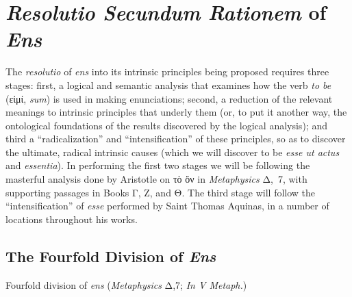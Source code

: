 \section{\emph{Resolutio Secundum Rationem} of \emph{Ens}}

The \emph{resolutio} of \emph{ens} into its intrinsic principles being proposed requires three stages: first, a logical and semantic analysis that examines how the verb \emph{to be} (εἰμί, \emph{sum}) is used in making enunciations; second, a reduction of the relevant meanings to intrinsic principles that underly them (or, to put it another way, the ontological foundations of the results discovered by the logical analysis); and third a “radicalization” and “intensification” of these principles, so as to discover the ultimate, radical intrinsic causes (which we will discover to be \emph{esse ut actus} and \emph{essentia}). In performing the first two stages we will be following the masterful analysis done by Aristotle on τὸ ὄν in \emph{Metaphysics} Δ,~7, with supporting passages in Books Γ, Ζ, and Θ. The third stage will follow the “intensification” of \emph{esse} performed by Saint Thomas Aquinas, in a number of locations throughout his works.

\subsection{The Fourfold Division of \emph{Ens}}
\label{fourfold-division}

\begin{DONE}
Fourfold division of \emph{ens} (\emph{Metaphysics} Δ,7; \emph{In V Metaph.})
\end{DONE}

